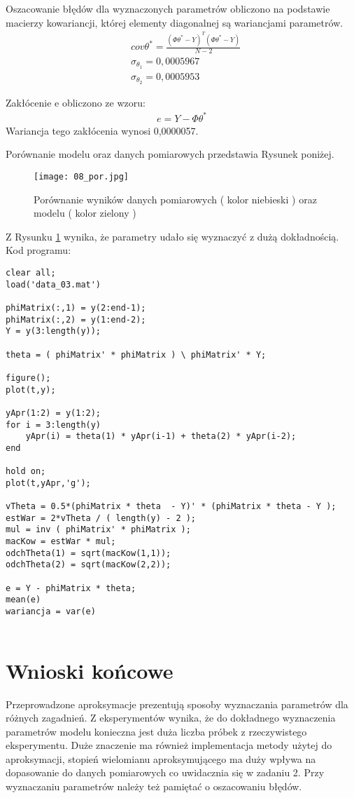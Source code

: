 \documentclass[a4paper,15pt]{article}
\begin{document}
Oszacowanie błędów dla wyznaczonych parametrów obliczono na podstawie macierzy kowariancji, której elementy diagonalnej są wariancjami parametrów.
\begin{align*}
& cov \theta ^* = \frac{(\Phi\theta ^* - Y)^T (\Phi\theta ^* - Y)}{N-2} \\
& \sigma_{\theta _1} = 0,0005967 \\
& \sigma_{\theta _2} = 0,0005953
\end{align*}

Zakłócenie e obliczono ze wzoru:
\begin{align*}
e = Y - \Phi \theta ^ *
\end{align*}
Wariancja tego zakłócenia wynosi  0,0000057. 

Porównanie modelu oraz danych pomiarowych przedstawia Rysunek poniżej.
\begin{figure}[H]
\centerline{\texttt{[image: 08\_por.jpg]}}
\centering
\caption{Porównanie wyników danych pomiarowych ( kolor niebieski ) oraz modelu ( kolor zielony )}
\label{fig:08_por}
\end{figure}
Z Rysunku \ref{fig:08_por} wynika, że parametry udało się wyznaczyć z dużą dokładnością. 
Kod programu: 
\begin{lstlisting}[caption=Zadanie 3, captionpos=b,label=lis1, firstnumber=1,frame=single]
clear all;
load('data_03.mat')

phiMatrix(:,1) = y(2:end-1);  
phiMatrix(:,2) = y(1:end-2); 
Y = y(3:length(y));

theta = ( phiMatrix' * phiMatrix ) \ phiMatrix' * Y;

figure();
plot(t,y);

yApr(1:2) = y(1:2); 
for i = 3:length(y)
    yApr(i) = theta(1) * yApr(i-1) + theta(2) * yApr(i-2); 
end

hold on;
plot(t,yApr,'g');

vTheta = 0.5*(phiMatrix * theta  - Y)' * (phiMatrix * theta - Y );
estWar = 2*vTheta / ( length(y) - 2 );
mul = inv ( phiMatrix' * phiMatrix );
macKow = estWar * mul;
odchTheta(1) = sqrt(macKow(1,1));
odchTheta(2) = sqrt(macKow(2,2));

e = Y - phiMatrix * theta;
mean(e)
wariancja = var(e)


\end{lstlisting}


\section{Wnioski końcowe}
Przeprowadzone aproksymacje prezentują sposoby wyznaczania parametrów dla różnych zagadnień. Z eksperymentów wynika, że do dokładnego wyznaczenia parametrów modelu konieczna jest duża liczba próbek z rzeczywistego eksperymentu. Duże znaczenie ma również implementacja metody użytej do aproksymacji, stopień wielomianu aproksymującego ma duży wpływa na dopasowanie do danych pomiarowych co uwidacznia się w zadaniu 2. Przy wyznaczaniu parametrów należy też pamiętać o oszacowaniu błędów. 
 
\end{document}
